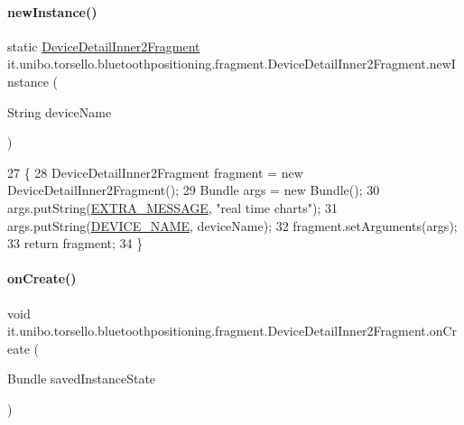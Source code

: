 \paragraph{\texorpdfstring{new\+Instance()}{newInstance()}}
{\footnotesize\ttfamily static \hyperlink{classit_1_1unibo_1_1torsello_1_1bluetoothpositioning_1_1fragment_1_1DeviceDetailInner2Fragment}{Device\+Detail\+Inner2\+Fragment} it.\+unibo.\+torsello.\+bluetoothpositioning.\+fragment.\+Device\+Detail\+Inner2\+Fragment.\+new\+Instance (\begin{DoxyParamCaption}\item[{String}]{device\+Name }\end{DoxyParamCaption})\hspace{0.3cm}{\ttfamily [static]}}


\begin{DoxyCode}
27                                                                             \{
28         DeviceDetailInner2Fragment fragment = \textcolor{keyword}{new} DeviceDetailInner2Fragment();
29         Bundle args = \textcolor{keyword}{new} Bundle();
30         args.putString(\hyperlink{classit_1_1unibo_1_1torsello_1_1bluetoothpositioning_1_1fragment_1_1DeviceDetailInner2Fragment_a5093b051b0d458a870b6eef51b088e7d_a5093b051b0d458a870b6eef51b088e7d}{EXTRA\_MESSAGE}, \textcolor{stringliteral}{"real time charts"});
31         args.putString(\hyperlink{classit_1_1unibo_1_1torsello_1_1bluetoothpositioning_1_1fragment_1_1DeviceDetailInner2Fragment_aa28d537983d4cf578120a9c51eb2b0bb_aa28d537983d4cf578120a9c51eb2b0bb}{DEVICE\_NAME}, deviceName);
32         fragment.setArguments(args);
33         \textcolor{keywordflow}{return} fragment;
34     \}
\end{DoxyCode}
\hypertarget{classit_1_1unibo_1_1torsello_1_1bluetoothpositioning_1_1fragment_1_1DeviceDetailInner2Fragment_a0f0b6b90d40bb3f44a66de91da787f75_a0f0b6b90d40bb3f44a66de91da787f75}{}\label{classit_1_1unibo_1_1torsello_1_1bluetoothpositioning_1_1fragment_1_1DeviceDetailInner2Fragment_a0f0b6b90d40bb3f44a66de91da787f75_a0f0b6b90d40bb3f44a66de91da787f75} 
\paragraph{\texorpdfstring{on\+Create()}{onCreate()}}
{\footnotesize\ttfamily void it.\+unibo.\+torsello.\+bluetoothpositioning.\+fragment.\+Device\+Detail\+Inner2\+Fragment.\+on\+Create (\begin{DoxyParamCaption}\item[{Bundle}]{saved\+Instance\+State }\end{DoxyParamCaption})}


